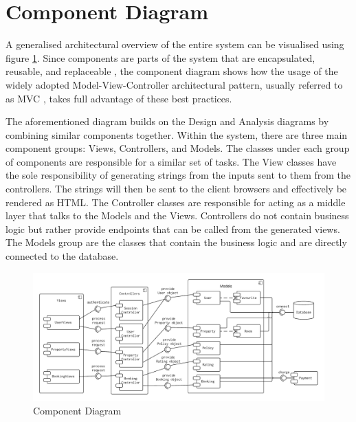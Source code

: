 \section{Component Diagram}\label{component_section}
A generalised architectural overview of the entire system can be visualised using figure \ref{component_diagram}. Since components are parts of the system that are encapsulated, reusable, and replaceable \cite{Hamilton2006}, the component diagram shows how the usage of the widely adopted Model-View-Controller architectural pattern, usually referred to as MVC \cite{Fowler2006}, takes full advantage of these best practices.

The aforementioned diagram builds on the Design and Analysis diagrams by combining similar components together. Within the system, there are three main component groups: Views, Controllers, and Models. The classes under each group of components are responsible for a similar set of tasks. The View classes have the sole responsibility of generating strings from the inputs sent to them from the controllers. The strings will then be sent to the client browsers and effectively be rendered as HTML. The Controller classes are responsible for acting as a middle layer that talks to the Models and the Views. Controllers do not contain business logic but rather provide endpoints that can be called from the generated views. The Models group are the classes that contain the business logic and are directly connected to the database. 

\begin{figure}[H]
    \centering
    \includegraphics[width=\textwidth]{img/component_diagram.png}
    \caption{Component Diagram}
    \label{component_diagram}
\end{figure}


